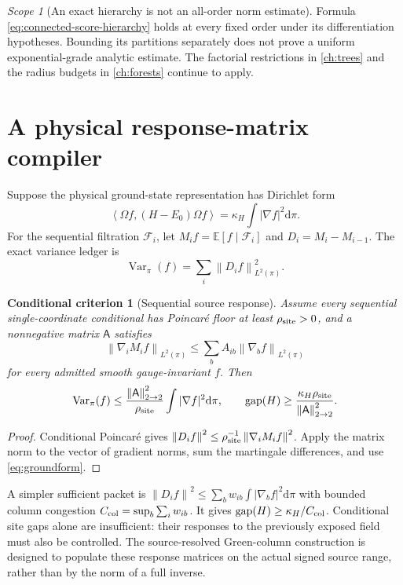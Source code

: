 \documentclass[11pt,oneside,openany]{book}
\newtheorem{criterion}[criterion]{Conditional criterion}
\theoremstyle{definition}
\theoremstyle{remark}
\newtheorem{scope}[scope]{Scope}
\newcommand{\E}{\mathbb E}
\newcommand{\dd}{\mathrm d}
\newcommand{\Var}{\operatorname{Var}}
\newcommand{\gap}{\operatorname{gap}}
\newcommand{\norm}[1]{\left\lVert#1\right\rVert}
\newcommand{\ip}[2]{\left\langle#1,#2\right\rangle}
\newcommand{\src}[2]{\cite[#2]{#1}}
\begin{document}
\begin{scope}[An exact hierarchy is not an all-order norm estimate]
Formula \cref{eq:connected-score-hierarchy} holds at every fixed order
under its differentiation hypotheses. Bounding its partitions separately
does not prove a uniform exponential-grade analytic estimate. The
factorial restrictions in \cref{ch:trees} and the radius budgets in
\cref{ch:forests} continue to apply.
\end{scope}

\section{A physical response-matrix compiler}
Suppose the physical ground-state representation has Dirichlet form
\begin{equation}\label{eq:groundform}
\ip{\Omega f}{(H-E_0)\Omega f}
=\kappa_H\int|\nabla f|^2\dd\pi.
\end{equation}
For the sequential filtration $\mathcal F_i$, let $M_i f=\E[f\mid\mathcal F_i]$ and $D_i=M_i-M_{i-1}$. The exact variance ledger is
\[
\Var_\pi(f)=\sum_i\norm{D_if}_{L^2(\pi)}^2.
\]

\begin{criterion}[Sequential source response]\label{thm:response-matrix}
Assume every sequential single-coordinate conditional has Poincar\'e floor at least $\rho_{\rm site}>0$, and a nonnegative matrix $\mathsf A$ satisfies
\[
\norm{\nabla_iM_if}_{L^2(\pi)}
\le\sum_bA_{ib}\norm{\nabla_bf}_{L^2(\pi)}
\]
for every admitted smooth gauge-invariant $f$. Then
\begin{equation}\label{eq:response-gap}
\Var_\pi(f)\le\frac{\norm{\mathsf A}_{2\to2}^2}{\rho_{\rm site}}
\int|\nabla f|^2\dd\pi,\qquad
\gap(H)\ge\frac{\kappa_H\rho_{\rm site}}{\norm{\mathsf A}_{2\to2}^2}.
\end{equation}
\end{criterion}
\begin{proof}
Conditional Poincar\'e gives $\norm{D_if}^2\le\rho_{\rm site}^{-1}\norm{\nabla_iM_if}^2$. Apply the matrix norm to the vector of gradient norms, sum the martingale differences, and use \cref{eq:groundform}.
\end{proof}

A simpler sufficient packet is $\norm{D_if}^2\le\sum_bw_{ib}\int|\nabla_bf|^2\dd\pi$ with bounded column congestion $C_{\rm col}=\sup_b\sum_iw_{ib}$. It gives $\gap(H)\ge\kappa_H/C_{\rm col}$. Conditional site gaps alone are insufficient: their responses to the previously exposed field must also be controlled. The source-resolved Green-column construction is designed to populate these response matrices on the actual signed source range, rather than by the norm of a full inverse. \src{F1}{V7, V14--V16}
\end{document}
